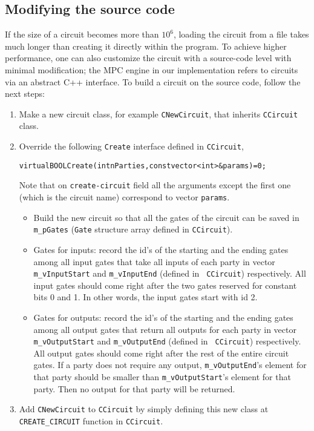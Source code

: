 \documentclass{article}
\begin{document}
\subsection{Modifying the source code}\label{subsec:source_code}
If the size of a circuit becomes more than $10^6$, loading the circuit
from a file takes much longer than creating it directly within the
program.  To achieve higher performance, one can also customize the
circuit with a source-code level with minimal modification; the MPC
engine in our implementation refers to circuits via an abstract C++
interface. To build a circuit on the source code, follow the next steps:

\begin{enumerate}
\item
Make a new circuit class, for example {\tt CNewCircuit}, that inherits {\tt CCircuit} class.

\item
Override the following {\tt Create} interface defined in {\tt CCircuit},
\begin{alltt}
virtual BOOL Create(int nParties, const vector<int>& params) = 0;
\end{alltt}

Note that on {\tt create-circuit} field all the arguments
except the first one (which is the circuit name) correspond
to vector {\tt params}.
    \begin{itemize}
        \item Build the new circuit so that all the
            gates of the circuit can be saved in {\tt
            m\_pGates} ({\tt Gate} structure array
            defined in {\tt CCircuit}).
        \item Gates for inputs: record the id's of the
            starting and the ending gates among all
            input gates that take all inputs of each
            party in vector {\tt m\_vInputStart} and
            {\tt m\_vInputEnd} (defined in {\tt
            CCircuit}) respectively. All input gates
            should come right after the two gates
            reserved for constant bits 0 and 1. In
            other words, the input gates start with id
            2.
        \item Gates for outputs: record the id's of the
            starting and the ending gates among all
            output gates that return all outputs for
            each party in vector {\tt m\_vOutputStart}
            and {\tt m\_vOutputEnd} (defined in {\tt
            CCircuit}) respectively. All output gates
            should come right after the rest of the
            entire circuit gates. If a party does not
            require any output, {\tt m\_vOutputEnd}'s
            element for that party should be smaller
            than {\tt m\_vOutputStart}'s element for
            that party. Then no output for that party
            will be returned.
    \end{itemize}
\item Add {\tt CNewCircuit} to {\tt CCircuit} by simply
    defining this new class at {\tt CREATE\_CIRCUIT}
    function in {\tt CCircuit}.

\end{enumerate}
\end{document}
